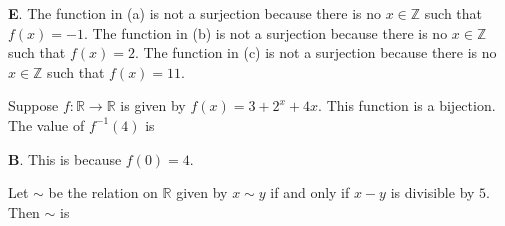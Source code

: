 \documentclass[addpoints]{exam}
\begin{document}
\begin{questions}
	\begin{solution}
		\textbf{E}. The function in (a) is not a surjection because there is no $x \in \mathbb{Z}$ such that $f(x) = -1$. The function in (b) is not a surjection because there is no $x \in \mathbb{Z}$ such that $f(x) = 2$. The function in (c) is not a surjection because there is no $x \in \mathbb{Z}$ such that $f(x) = 11$. 
	\end{solution}


\question[2] Suppose $f: \mathbb{R} \rightarrow \mathbb{R}$ is given by $f(x) = 3 + 2^x + 4x$. This function is a bijection. The value of $f^{-1}(4)$ is 

\begin{solution}
	\textbf{B}. This is because $f(0) = 4$. 
\end{solution}


\question[2] Let $\sim$ be the relation on $\mathbb{R}$ given by $x \sim y$ if and only if $x-y$ is divisible by $5$. Then $\sim$ is 
\end{questions}
\end{document}
